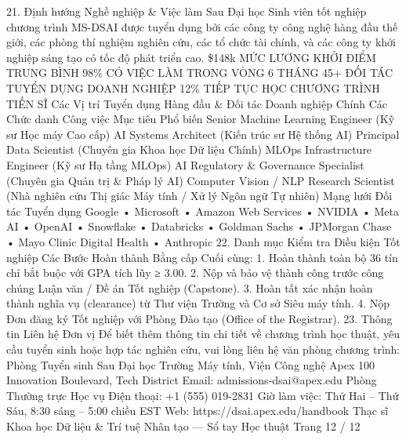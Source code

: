 \documentclass[12pt]{article}
\begin{document}
21. Định hướng Nghề nghiệp \& Việc làm Sau Đại học
Sinh viên tốt nghiệp chương trình MS-DSAI được tuyển dụng bởi các công ty công nghệ hàng đầu thế giới, các phòng thí nghiệm nghiên cứu, các tổ chức tài chính, và các công ty khởi nghiệp sáng tạo có tốc độ phát triển cao.
\$148k
MỨC LƯƠNG KHỞI ĐIỂM TRUNG BÌNH
98\%
CÓ VIỆC LÀM TRONG VÒNG 6 THÁNG
45+
ĐỐI TÁC TUYỂN DỤNG DOANH NGHIỆP
12\%
TIẾP TỤC HỌC CHƯƠNG TRÌNH TIẾN SĨ
Các Vị trí Tuyển dụng Hàng đầu \& Đối tác Doanh nghiệp Chính
Các Chức danh Công việc Mục tiêu Phổ biến
Senior Machine Learning Engineer (Kỹ sư Học máy Cao cấp)
AI Systems Architect (Kiến trúc sư Hệ thống AI)
Principal Data Scientist (Chuyên gia Khoa học Dữ liệu Chính)
MLOps Infrastructure Engineer (Kỹ sư Hạ tầng MLOps)
AI Regulatory \& Governance Specialist (Chuyên gia Quản trị \& Pháp lý AI)
Computer Vision / NLP Research Scientist (Nhà nghiên cứu Thị giác Máy tính / Xử lý Ngôn ngữ Tự nhiên)
Mạng lưới Đối tác Tuyển dụng
Google • Microsoft • Amazon Web Services • NVIDIA • Meta AI
• OpenAI • Snowflake • Databricks • Goldman Sachs •
JPMorgan Chase • Mayo Clinic Digital Health • Anthropic
22. Danh mục Kiểm tra Điều kiện Tốt nghiệp
Các Bước Hoàn thành Bằng cấp Cuối cùng:
1. Hoàn thành toàn bộ 36 tín chỉ bắt buộc với GPA tích lũy ≥ 3.00.
2. Nộp và bảo vệ thành công trước công chúng Luận văn / Đề án Tốt nghiệp (Capstone).
3. Hoàn tất xác nhận hoàn thành nghĩa vụ (clearance) từ Thư viện Trường và Cơ sở Siêu máy tính.
4. Nộp Đơn đăng ký Tốt nghiệp với Phòng Đào tạo (Office of the Registrar).
23. Thông tin Liên hệ Đơn vị
Để biết thêm thông tin chi tiết về chương trình học thuật, yêu cầu tuyển sinh hoặc hợp tác nghiên cứu, vui lòng liên hệ văn phòng chương trình:
Phòng Tuyển sinh Sau Đại học
Trường Máy tính, Viện Công nghệ Apex
100 Innovation Boulevard, Tech District
Email: admissions-dsai@apex.edu
Phòng Thường trực Học vụ
Điện thoại: +1 (555) 019-2831
Giờ làm việc: Thứ Hai – Thứ Sáu, 8:30 sáng – 5:00 chiều EST
Web: https://dsai.apex.edu/handbook
Thạc sĩ Khoa học Dữ liệu \& Trí tuệ Nhân tạo — Sổ tay Học thuật
Trang 12 / 12
\end{document}

